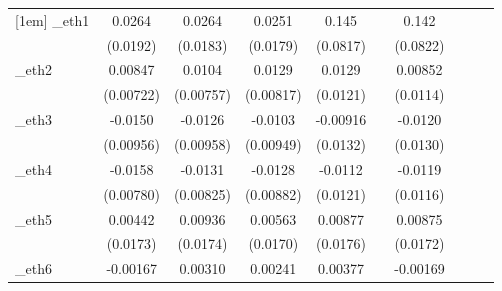 \begin{table}[htbp]
\begin{tabular}{l*{9}{c}}
[1em]
\_eth1       &      0.0264         &      0.0264         &      0.0251         &       0.145\sym{*}  &                     &       0.142\sym{*}  &                     &                     &                     \\
            &    (0.0192)         &    (0.0183)         &    (0.0179)         &    (0.0817)         &                     &    (0.0822)         &                     &                     &                     \\
[1em]
\_eth2       &     0.00847         &      0.0104         &      0.0129         &      0.0129         &                     &     0.00852         &                     &                     &                     \\
            &   (0.00722)         &   (0.00757)         &   (0.00817)         &    (0.0121)         &                     &    (0.0114)         &                     &                     &                     \\
[1em]
\_eth3       &     -0.0150         &     -0.0126         &     -0.0103         &    -0.00916         &                     &     -0.0120         &                     &                     &                     \\
            &   (0.00956)         &   (0.00958)         &   (0.00949)         &    (0.0132)         &                     &    (0.0130)         &                     &                     &                     \\
[1em]
\_eth4       &     -0.0158\sym{**} &     -0.0131         &     -0.0128         &     -0.0112         &                     &     -0.0119         &                     &                     &                     \\
            &   (0.00780)         &   (0.00825)         &   (0.00882)         &    (0.0121)         &                     &    (0.0116)         &                     &                     &                     \\
[1em]
\_eth5       &     0.00442         &     0.00936         &     0.00563         &     0.00877         &                     &     0.00875         &                     &                     &                     \\
            &    (0.0173)         &    (0.0174)         &    (0.0170)         &    (0.0176)         &                     &    (0.0172)         &                     &                     &                     \\
[1em]
\_eth6       &    -0.00167         &     0.00310         &     0.00241         &     0.00377         &                     &    -0.00169         &                     &                     &                     \\

\end{tabular}
\end{table}

